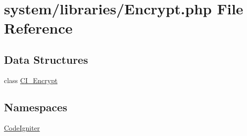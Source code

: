 \hypertarget{_encrypt_8php}{\section{system/libraries/\-Encrypt.php File Reference}
\label{_encrypt_8php}
}
\subsection*{Data Structures}
\begin{DoxyCompactItemize}
\item 
class \hyperlink{class_c_i___encrypt}{C\-I\-\_\-\-Encrypt}
\end{DoxyCompactItemize}
\subsection*{Namespaces}
\begin{DoxyCompactItemize}
\item 
\hyperlink{namespace_code_igniter}{Code\-Igniter}
\end{DoxyCompactItemize}

